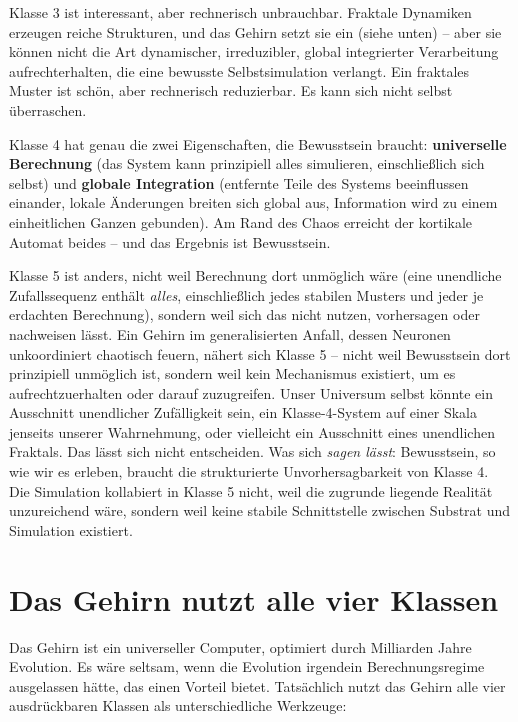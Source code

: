\documentclass[11pt, twoside, openright]{book}
\begin{document}
Klasse 3 ist interessant, aber rechnerisch unbrauchbar. Fraktale Dynamiken erzeugen reiche Strukturen, und das Gehirn setzt sie ein (siehe unten) -- aber sie können nicht die Art dynamischer, irreduzibler, global integrierter Verarbeitung aufrechterhalten, die eine bewusste Selbstsimulation verlangt. Ein fraktales Muster ist schön, aber rechnerisch reduzierbar. Es kann sich nicht selbst überraschen.

Klasse 4 hat genau die zwei Eigenschaften, die Bewusstsein braucht: \textbf{universelle Berechnung} (das System kann prinzipiell alles simulieren, einschließlich sich selbst) und \textbf{globale Integration} (entfernte Teile des Systems beeinflussen einander, lokale Änderungen breiten sich global aus, Information wird zu einem einheitlichen Ganzen gebunden). Am Rand des Chaos erreicht der kortikale Automat beides -- und das Ergebnis ist Bewusstsein.

Klasse 5 ist anders, nicht weil Berechnung dort unmöglich wäre (eine unendliche Zufallssequenz enthält \textit{alles}, einschließlich jedes stabilen Musters und jeder je erdachten Berechnung), sondern weil sich das nicht nutzen, vorhersagen oder nachweisen lässt. Ein Gehirn im generalisierten Anfall, dessen Neuronen unkoordiniert chaotisch feuern, nähert sich Klasse 5 -- nicht weil Bewusstsein dort prinzipiell unmöglich ist, sondern weil kein Mechanismus existiert, um es aufrechtzuerhalten oder darauf zuzugreifen. Unser Universum selbst könnte ein Ausschnitt unendlicher Zufälligkeit sein, ein Klasse-4-System auf einer Skala jenseits unserer Wahrnehmung, oder vielleicht ein Ausschnitt eines unendlichen Fraktals. Das lässt sich nicht entscheiden. Was sich \textit{sagen lässt}: Bewusstsein, so wie wir es erleben, braucht die strukturierte Unvorhersagbarkeit von Klasse 4. Die Simulation kollabiert in Klasse 5 nicht, weil die zugrunde liegende Realität unzureichend wäre, sondern weil keine stabile Schnittstelle zwischen Substrat und Simulation existiert.

\section*{Das Gehirn nutzt alle vier Klassen}

Das Gehirn ist ein universeller Computer, optimiert durch Milliarden Jahre Evolution. Es wäre seltsam, wenn die Evolution irgendein Berechnungsregime ausgelassen hätte, das einen Vorteil bietet. Tatsächlich nutzt das Gehirn alle vier ausdrückbaren Klassen als unterschiedliche Werkzeuge:
\end{document}
